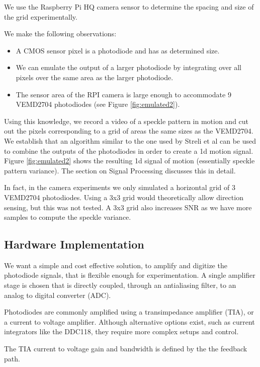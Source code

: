 We use the Raspberry Pi HQ camera sensor to determine the spacing and size of the grid experimentally.

We make the following observations:
\begin{itemize}
  
  \item A CMOS sensor pixel is a photodiode and has as determined size.
  \item We can emulate the output of a larger photodiode by integrating over all pixels over the same area as the larger photodiode.
  \item The sensor area of the RPI camera is large enough to accommodate 9 VEMD2704 photodiodes (see Figure \ref{fig:emulated2}).
\end{itemize}

Using this knowledge, we record a video of a speckle pattern in motion and cut out the pixels corresponding to a grid of areas the same sizes as the VEMD2704.
We establish that an algorithm similar to the one used by Streli et al \cite{structured-light-speckle} can be used to combine the outputs of the photodiodes in order to create a 1d motion signal.
Figure \ref{fig:emulated2} shows the resulting 1d signal of motion (essentially speckle pattern variance). The section on Signal Processing discusses this in detail.

In fact, in the camera experiments we only simulated a horizontal grid of 3 VEMD2704 photodiodes. Using a 3x3 grid would theoretically allow direction sensing, but this was not tested. A 3x3 grid also increases SNR as we have more samples to compute the speckle variance.

\subsection{Hardware Implementation}
We want a simple and cost effective solution, to amplify and digitize the photodiode signals, that is flexible enough for experimentation.
A single amplifier stage is chosen that is directly coupled, through an antialiasing filter, to an analog to digital converter (ADC). 

Photodiodes are commonly amplified using a transimpedance amplifier (TIA), or a current to voltage amplifier. Although alternative options exist, such as current integrators like the DDC118, they require more complex setups and control.

The TIA current to voltage gain and bandwidth is defined by the the feedback path.

